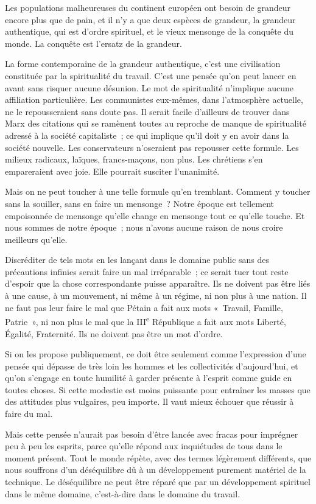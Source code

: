 \documentclass[french,twoside]{book} %
\begin{document}
Les populations malheureuses du continent européen ont besoin de grandeur encore plus que de pain, et il n'y a que deux espèces de grandeur, la grandeur authentique, qui est d'ordre spirituel, et le vieux mensonge de la conquête du monde. La conquête est l'ersatz de la grandeur.\par
\par
La forme contemporaine de la grandeur authentique, c'est une civilisation constituée par la spiritualité du travail. C'est une pensée qu'on peut lancer en avant sans risquer aucune désunion. Le mot de spiritualité n'implique aucune affiliation particulière. Les communistes eux-mêmes, dans l'atmosphère actuelle, ne le repousseraient sans doute pas. Il serait facile d'ailleurs de trouver dans Marx des citations qui se ramènent toutes au reproche de manque de spiritualité adressé à la société capitaliste ; ce qui implique qu'il doit y en avoir dans la société nouvelle. Les conservateurs n'oseraient pas repousser cette formule. Les milieux radicaux, laïques, francs-maçons, non plus. Les chrétiens s'en empareraient avec joie. Elle pourrait susciter l'unanimité.\par
Mais on ne peut toucher à une telle formule qu'en tremblant. Comment y toucher sans la souiller, sans en faire un mensonge ? Notre époque est tellement empoisonnée de mensonge qu'elle change en mensonge tout ce qu'elle touche. Et nous sommes de notre époque ; nous n'avons aucune raison de nous croire meilleurs qu'elle.\par
Discréditer de tels mots en les lançant dans le domaine public sans des précautions infinies serait faire un mal irréparable ; ce serait tuer tout reste d'espoir que la chose correspondante puisse apparaître. Ils ne doivent pas être liés à une cause, à un mouvement, ni même à un régime, ni non plus à une nation. Il ne faut pas leur faire le mal que Pétain a fait aux mots « Travail, Famille, Patrie », ni non plus le mal que la III\textsuperscript{e} République a fait aux mots Liberté, Égalité, Fraternité. Ils ne doivent pas être un mot d'ordre.\par
Si on les propose publiquement, ce doit être seulement comme l'expression d'une pensée qui dépasse de très loin les hommes et les collectivités d'aujourd'hui, et qu'on s'engage en toute humilité à garder présente à l'esprit comme guide en toutes choses. Si cette modestie est moins puissante pour entraîner les masses que des attitudes plus vulgaires, peu importe. Il vaut mieux échouer que réussir à faire du mal.\par
Mais cette pensée n'aurait pas besoin d'être lancée avec fracas pour imprégner peu à peu les esprits, parce qu'elle répond aux inquiétudes de tous dans le moment présent. Tout le monde répète, avec des termes légèrement différents, que nous souffrons d'un déséquilibre dû à un développement purement matériel de la technique. Le déséquilibre ne peut être réparé que par un développement spirituel dans le même domaine, c'est-à-dire dans le domaine du travail.\par
\end{document}
